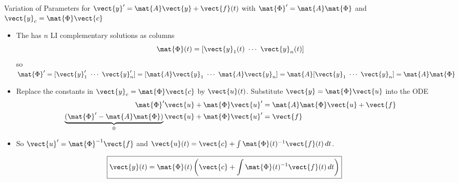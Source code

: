 \documentclass[11pt,aspectratio=169]{beamer}
\begin{document}
\begin{frame}{Variation of Parameters for $\vect{y}'=\mat{A}\vect{y}+\vect{f}(t)$ with $\mat{\Phi}'=\mat{A}\mat{\Phi}$ and $\vect{y}_c=\mat{\Phi}\vect{c}$
	}
\begin{itemize}
  \item The  has $n$ LI complementary solutions as columns
  \[
    \mat{\Phi}(t)=[\vect{y}_1(t)\ \cdots\ \vect{y}_n(t)]
  \]
  so $\mat{\Phi}'=[\vect{y}_1'\ \cdots\ \vect{y}_n']=[\mat{A}\vect{y}_1\ \cdots\ \mat{A}\vect{y}_n]=\mat{A}[\vect{y}_1\ \cdots\ \vect{y}_n]=\mat{A}\mat{\Phi}$
  \item Replace the constants in $\vect{y}_c=\mat{\Phi}\vect{c}$ by $\vect{u}(t)$.
  Substitute $\vect{y}=\mat{\Phi}\vect{u}$ into the ODE
  \[
    \begin{aligned}
      \mat{\Phi}'\vect{u}+\mat{\Phi}\vect{u}'
        &=\mat{A}\mat{\Phi}\vect{u}+\vect{f}\\
      \underbrace{(\mat{\Phi}'-\mat{A}\mat{\Phi})}_{0}\vect{u}
        +\mat{\Phi}\vect{u}'&=\vect{f}
    \end{aligned}
  \]
  \item So $\vect{u}'=\mat{\Phi}^{-1}\vect{f}$ and
  $\vect{u}(t)=\vect{c}+\int\mat{\Phi}(t)^{-1}\vect{f}(t)\,dt$.
\end{itemize}
\vfill
\[
  \boxed{\vect{y}(t)=\mat{\Phi}(t)\left(\vect{c}+\int\mat{\Phi}(t)^{-1}\vect{f}(t)\,dt\right)}
\]
\end{frame}
\end{document}
